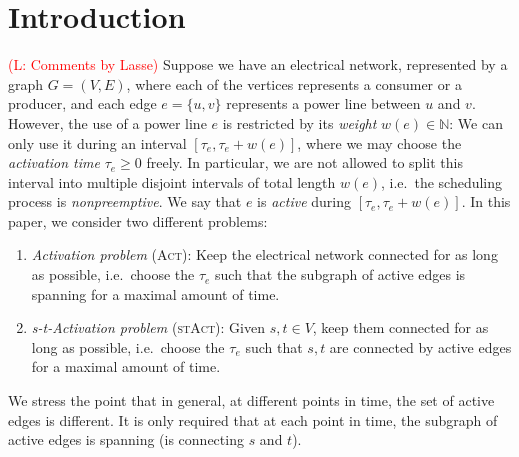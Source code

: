 \documentclass[runningheads]{llncs}
\numberwithin{equation}{section}
\newcommand{\N}{\mathbb{N}}
\newcommand{\comment}[1]{\textcolor{red}{(L: #1)}}
\newcommand{\act}{\textsc{(Act)}}
\newcommand{\stact}{\textsc{(stAct)}}
\begin{document}
\section{Introduction}
\comment{Comments by Lasse}
Suppose we have an electrical network, represented by a graph $G = (V,E)$, where each of the vertices represents a consumer or a producer, and each edge $e = \{u,v\}$ represents a power line between $u$ and $v$. However, the use of a power line $e$ is restricted by its \emph{weight} $w(e) \in \N$: We can only use it during an interval $[\tau_e, \tau_e + w(e)]$, where we may choose the \emph{activation time} $\tau_e \geq 0$ freely. In particular, we are not allowed to split this interval into multiple disjoint intervals of total length $w(e)$, i.e.\ the scheduling process is \emph{nonpreemptive}. We say that $e$ is \emph{active} during $[\tau_e, \tau_e + w(e)]$. In this paper, we consider two different problems:
\begin{enumerate}
\item \emph{Activation problem} \act: Keep the electrical network connected for as long as possible, i.e.\ choose the $\tau_e$ such that the subgraph of active edges is spanning for a maximal amount of time. 
\item \emph{s-t-Activation problem} \stact: Given $s, t \in V$, keep them connected for as long as possible, i.e.\ choose the $\tau_e$ such that $s, t$ are connected by active edges for a maximal amount of time.
\end{enumerate}

We stress the point that in general, at different points in time, the set of active edges is different. It is only required that at each point in time, the subgraph of active edges is spanning (is connecting $s$ and $t$). 
\end{document}
